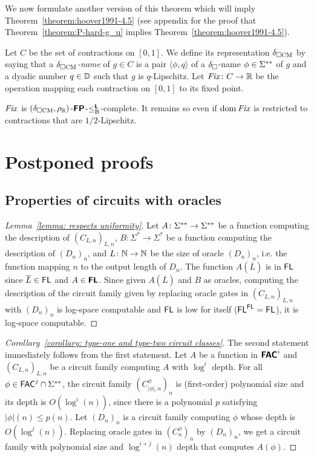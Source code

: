 \documentclass[envcountsame,orivec,oribibl]{llncs}
\begin{document}
We now formulate another version of this theorem which 
will imply Theorem~\ref{theorem:hoover1991-4.5}
(see appendix for the proof that Theorem~\ref{theorem:P-hard-g_u} 
implies Theorem~\ref{theorem:hoover1991-4.5}). 

Let $C$ be the set of contractions on $[0, 1]$. 
We define its representation $\delta _{\square \mathrm{CM}}$ by saying that 
a \emph{$\delta _{\square \mathrm{CM}}$-name} of $g \in C$
is a pair $\langle \phi, q \rangle$ of 
a $\delta _\square$-name $\phi \in \Sigma ^{**}$ of $g$ 
and a dyadic number $q \in \mathbb D$ such that $g$ is $q$-Lipschitz. 
Let $\mathit{Fix} \colon C \to \mathbb R$ be the operation 
mapping each contraction on $[0, 1]$ to its fixed point.

\begin{theorem}
\label{theorem:P-hard-g_u}
$\mathit{Fix}$ is $(\delta _{\square \mathrm{CM}}, \rho _\mathbb R)$-$\text{\bfseries \sffamily \upshape FP}$-$\leq _{\mathrm B} ^{\text{\bfseries \sffamily \upshape L}}$-complete. 
It remains so even if $\mathop{\rm dom} \mathit{Fix}$ is restricted to contractions 
that are $1/2$-Lipschitz.
\end{theorem}




\clearpage
\appendix
\section{Postponed proofs}

\subsection{Properties of circuits with oracles}

\begin{proof}[Lemma~\ref{lemma: respects uniformity}]
 Let $A \colon \Sigma ^{**} \to \Sigma ^{**}$ be a function computing the description of $(C_{L,n})_{L,n}$,
 $B \colon \Sigma^* \to \Sigma^*$ be a function computing the description of $(D_n)_n$, and
 $L \colon \mathbb N \to \mathbb N$ be the size of oracle $(D_n)_n$, i.e.
 the function mapping $n$ to the output length of $D_n$.
 The function $A(\overline{L})$ is in $\mathsf{FL}$ since $\overline{L} \in \mathsf{FL}$ and $A \in \text{\bfseries \sffamily \upshape FL}$.
 Since given $A(\overline{L})$ and $B$ as oracles,
 computing the description of the circuit family given by replacing oracle
 gates in $(C_{L,n})_{L,n}$ with $(D_n)_n$ is log-space computable
 and $\mathsf{FL}$ is low for itself ($\mathsf{FL}^{\mathsf{FL}} = \mathsf{FL}$),
 it is log-space computable.
\end{proof}

\begin{proof}[Corollary~\ref{corollary: type-one and type-two circuit classes}]
The second statement immediately follows from the first statement.
Let $A$ be a function in $\text{\bfseries \sffamily \upshape FAC}^i$ and $(C_{L,n})_{L,n}$ be a circuit
family computing $A$ with $\log^i$ depth.
For all $\phi \in \mathsf{FAC}^j \cap \Sigma ^{**}$, 
the circuit family $(C^\phi_{|\phi|,n})_n$ is (first-order) polynomial size and its depth is $O(\log^i(n))$,
since there is a polynomial $p$ satisfying $|\phi|(n) \le p(n)$.
Let $(D_n)_n$ is a circuit family computing $\phi$ whose depth is $O(\log^j(n))$.
Replacing oracle gates in $(C^\phi_n)_n$ by $(D_n)_n$, 
we get a circuit family with polynomial size and $\log^{i+j}(n)$ depth
that computes $A(\phi)$.
\end{proof}
\end{document}

